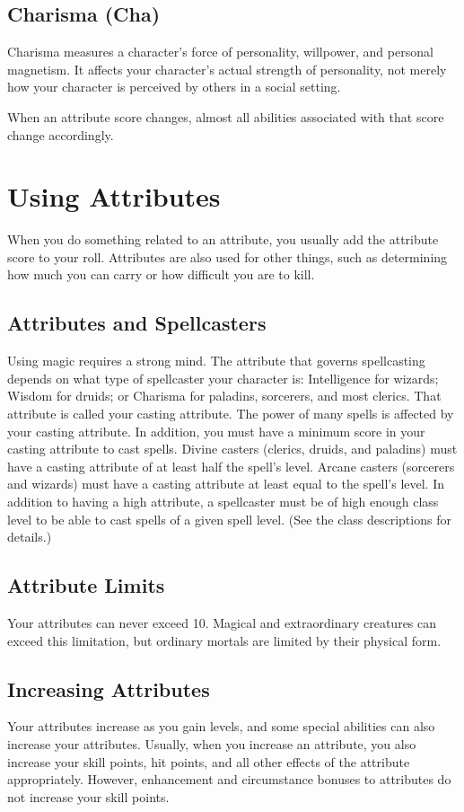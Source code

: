 \subsection{Charisma (Cha)}
Charisma measures a character's force of personality, willpower, and personal magnetism. It affects your character's actual strength of personality, not merely how your character is perceived by others in a social setting.

When an attribute score changes, almost all abilities associated with that score change accordingly.

\section{Using Attributes}
When you do something related to an attribute, you usually add the attribute score to your roll. Attributes are also used for other things, such as determining how much you can carry or how difficult you are to kill. 

\subsection{Attributes and Spellcasters}
Using magic requires a strong mind. The attribute that governs spellcasting depends on what type of spellcaster your character is: Intelligence for wizards; Wisdom for druids; or Charisma for paladins, sorcerers, and most clerics. That attribute is called your casting attribute. The power of many spells is affected by your casting attribute. In addition, you must have a minimum score in your casting attribute to cast spells. Divine casters (clerics, druids, and paladins) must have a casting attribute of at least half the spell's level. Arcane casters (sorcerers and wizards) must have a casting attribute at least equal to the spell's level. In addition to having a high attribute, a spellcaster must be of high enough class level to be able to cast spells of a given spell level. (See the class descriptions for details.)

\subsection{Attribute Limits}
Your attributes can never exceed 10. Magical and extraordinary creatures can exceed this limitation, but ordinary mortals are limited by their physical form.

\subsection{Increasing Attributes}
Your attributes increase as you gain levels, and some special abilities can also increase your attributes. Usually, when you increase an attribute, you also increase your skill points, hit points, and all other effects of the attribute appropriately. However, enhancement and circumstance bonuses to attributes do not increase your skill points.

